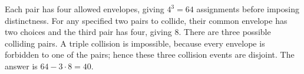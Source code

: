 Each pair has four allowed envelopes, giving $4^3=64$ assignments before imposing distinctness. For any specified two pairs to collide, their common envelope has two choices and the third pair has four, giving $8$. There are three possible colliding pairs. A triple collision is impossible, because every envelope is forbidden to one of the pairs; hence these three collision events are disjoint. The answer is $64-3\cdot8=\boxed{40}$.
